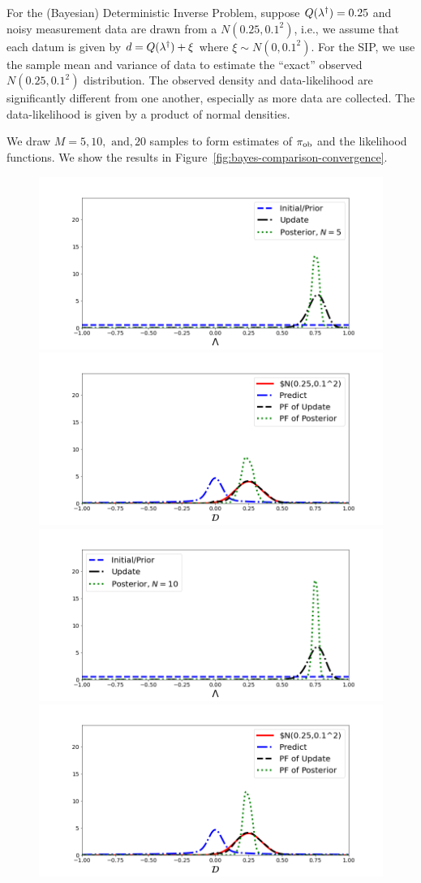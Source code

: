 \begin{ex}
For the (Bayesian) Deterministic Inverse Problem, suppose $Q(\lambda^\dagger)=0.25$ and noisy measurement data are drawn from a $N(0.25,0.1^2)$, i.e., we assume that each datum is given by $d=Q(\lambda^\dagger)+\xi$ where $\xi\sim N(0,0.1^2)$.
For the SIP, we use the sample mean and variance of data to estimate the ``exact'' observed $N(0.25,0.1^2)$ distribution.
The observed density and data-likelihood are significantly different from one another, especially as more data are collected.
The data-likelihood is given by a product of normal densities.

We draw $M=5, 10, \text{ and}, 20$ samples to form estimates of $\operatorname*{\pi_{ob}}$ and the likelihood functions.
We show the results in Figure~\ref{fig:bayes-comparison-convergence}.

\begin{figure}[htbp]
\centering
   \includegraphics[width=0.49\linewidth]{figures/bip-vs-sip-5.png}
   \includegraphics[width=0.49\linewidth]{figures/bip-vs-sip-pf-5.png}
   \includegraphics[width=0.49\linewidth]{figures/bip-vs-sip-10.png}
   \includegraphics[width=0.49\linewidth]{figures/bip-vs-sip-pf-10.png}

\end{figure}
\end{ex}
